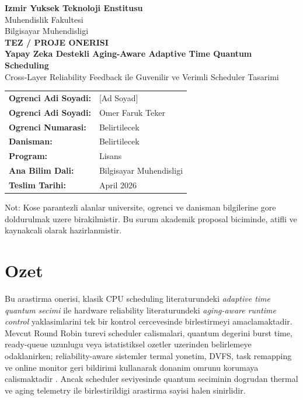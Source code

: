 \documentclass[12pt,a4paper]{article}
\begin{document}
\begin{titlepage}
\begin{center}
{\Large \textbf{Izmir Yuksek Teknoloji Enstitusu}}\\[0.8em]
{\large Muhendislik Fakultesi}\\
{\large Bilgisayar Muhendisligi}\\[2.5em]

{\LARGE \textbf{TEZ / PROJE ONERISI}}\\[1.0em]
{\Large \textbf{Yapay Zeka Destekli Aging-Aware Adaptive Time Quantum Scheduling}}\\[0.4em]
{\large Cross-Layer Reliability Feedback ile Guvenilir ve Verimli Scheduler Tasarimi}\\[2.0em]

\begin{tabular}{>{\bfseries}p{4.8cm}p{8.8cm}}
Ogrenci Adi Soyadi: & [Ad Soyad] \\
Ogrenci Adi Soyadi: & Omer Faruk Teker \\
Ogrenci Numarasi: & Belirtilecek \\
Danisman: & Belirtilecek \\
Program: & Lisans \\
Ana Bilim Dali: & Bilgisayar Muhendisligi \\
Teslim Tarihi: & April 2026 \\
\end{tabular}

\vfill
\begin{minipage}{0.92\textwidth}
\small
Not: Kose parantezli alanlar universite, ogrenci ve danisman bilgilerine gore doldurulmak uzere birakilmistir.
Bu surum akademik proposal biciminde, atifli ve kaynakcali olarak hazirlanmistir.
\end{minipage}
\end{center}
\end{titlepage}

\tableofcontents
\newpage

\section*{Ozet}

Bu arastirma onerisi, klasik CPU scheduling literaturundeki \textit{adaptive time quantum secimi}
ile hardware reliability literaturundeki \textit{aging-aware runtime control} yaklasimlarini tek bir
kontrol cercevesinde birlestirmeyi amaclamaktadir. Mevcut Round Robin turevi scheduler calismalari,
quantum degerini burst time, ready-queue uzunlugu veya istatistiksel ozetler uzerinden belirlemeye
odaklanirken; reliability-aware sistemler termal yonetim, DVFS, task remapping ve online monitor geri
bildirimi kullanarak donanim omrunu korumaya calismaktadir \cite{behera2010,marr2022,srinivasan2004,kumar2011}.
Ancak scheduler seviyesinde quantum seciminin dogrudan thermal ve aging telemetry ile birlestirildigi
arastirma sayisi halen sinirlidir.
\end{document}
